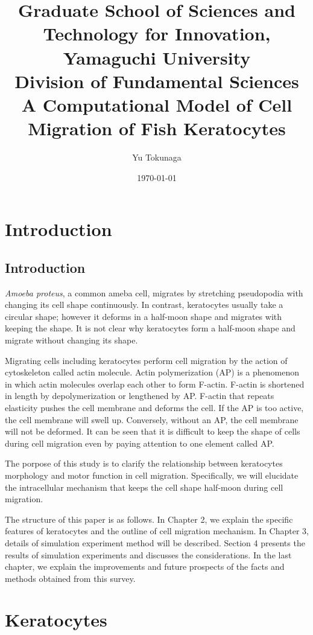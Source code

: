 \documentclass[a4paper,12pt]{book}
\title{\Large Graduate School of Sciences and Technology for Innovation, Yamaguchi University\\[1cm]
Division of Fundamental Sciences\\[3cm]
\huge A Computational Model of Cell Migration of Fish Keratocytes\\[5cm]
}
\author{Yu Tokunaga}
\date{\Large \today}
\begin{document}
\maketitle
\setcounter{page}{1}
\tableofcontents
\chapter{Introduction}
\setcounter{page}{1}
\section{Introduction}
{\it Amoeba proteus},  a common ameba cell, migrates by stretching pseudopodia with changing  its cell shape continuously.
In contrast, keratocytes usually take a circular shape; however it deforms in a half-moon shape and migrates with keeping the shape.
It is not clear why keratocytes form a half-moon shape and migrate without changing its shape.

Migrating cells including keratocytes perform cell migration by the action of cytoskeleton called actin molecule. 
Actin polymerization (AP) is a phenomenon in which actin molecules overlap each other to form F-actin. 
F-actin is shortened in length by depolymerization or lengthened by AP.
F-actin that repeats elasticity pushes the cell membrane and deforms the cell.
If the AP is too active, the cell membrane will swell up.
Conversely, without an AP, the cell membrane will not be deformed.
It can be seen that it is difficult to keep the shape of cells during cell migration even by paying attention to one element called AP.

The porpose of this study is to clarify the relationship between keratocytes morphology and motor function in cell migration. Specifically, we will elucidate the intracellular mechanism that keeps the cell shape half-moon during cell migration.

The structure of this paper is as follows. In Chapter 2, we explain the specific features of keratocytes and the outline of cell migration mechanism. In Chapter 3, details of simulation experiment method will be described. Section 4 presents the results of simulation experiments and discusses the considerations. In the last chapter, we explain the improvements and future prospects of the facts and methods obtained from this survey.

\chapter{Keratocytes}
\end{document}
